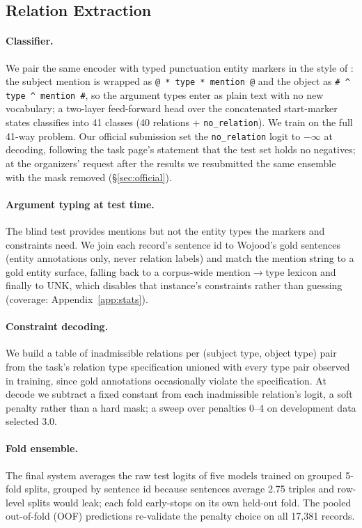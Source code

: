 \documentclass[11pt]{article}
\begin{document}
\subsection{Relation Extraction}

\paragraph{Classifier.} We pair the same encoder with typed punctuation
entity markers in the style of \citet{zhou-chen-2022-improved}: the
subject mention is wrapped as \texttt{@ * type * mention @} and the
object as
\texttt{\# \textasciicircum{} type \textasciicircum{} mention \#},
so the argument types enter as plain text with no new vocabulary; a
two-layer feed-forward head over the concatenated start-marker states
classifies into 41 classes (40 relations +
\texttt{no\_relation}). We train on the full 41-way problem. Our official
submission set the \texttt{no\_relation} logit to $-\infty$ at decoding,
following the task page's statement that the test set holds no
negatives; at the organizers' request after the results we resubmitted
the same ensemble with the mask removed (\S\ref{sec:official}).

\paragraph{Argument typing at test time.} The blind test provides
mentions but not the entity types the markers and constraints need. We
join each record's sentence id to Wojood's gold sentences (entity
annotations only, never relation labels) and match the mention string
to a gold entity surface, falling back to a corpus-wide
mention$\rightarrow$type lexicon and finally to UNK, which disables that
instance's constraints rather than guessing (coverage:
Appendix~\ref{app:stats}).

\paragraph{Constraint decoding.} We build a table of inadmissible
relations per (subject type, object type) pair from the task's relation
type specification unioned with every type pair observed in training,
since gold annotations occasionally violate the specification. At decode we subtract a
fixed constant from each inadmissible relation's logit, a soft penalty
rather than a hard mask; a sweep over penalties 0--4 on development data
selected 3.0.

\paragraph{Fold ensemble.} The final system averages the raw test logits
of five models trained on grouped 5-fold splits, grouped by sentence id
because sentences average 2.75 triples and row-level splits would leak;
each fold early-stops on its own held-out fold. The pooled out-of-fold
(OOF) predictions re-validate the penalty choice on all 17,381 records.
\end{document}
